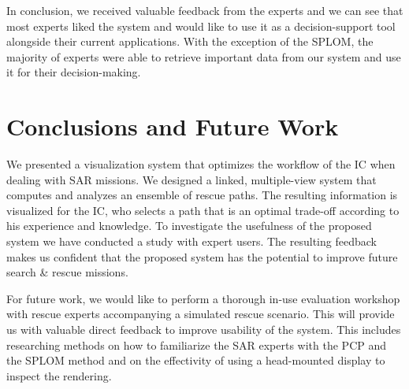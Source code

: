 \documentclass{egpubl}
\begin{document}
In conclusion, we received valuable feedback from the experts and we can see that most experts liked the system and would like to use it as a decision-support tool alongside their current applications. With the exception of the SPLOM, the majority of experts were able to retrieve important data from our system and use it for their decision-making.


\section{Conclusions and Future Work} \label{sec:conclusion}
We presented a visualization system that optimizes the workflow of the IC when dealing with SAR missions. We designed a linked, multiple-view system that computes and analyzes an ensemble of rescue paths. The resulting information is visualized for the IC, who selects a path that is an optimal trade-off according to his experience and knowledge. To investigate the usefulness of the proposed system we have conducted a study with expert users. The resulting feedback makes us confident that the proposed system has the potential to improve future search \& rescue missions.

For future work, we would like to perform a thorough in-use evaluation workshop with rescue experts accompanying a simulated rescue scenario. This will provide us with valuable direct feedback to improve usability of the system. This includes researching methods on how to familiarize the SAR experts with the PCP and the SPLOM method and on the effectivity of using a head-mounted display to inspect the rendering.


\end{document}
